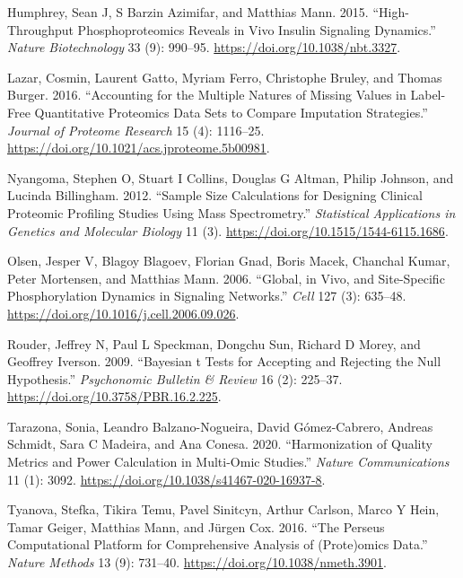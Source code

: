 \documentclass[
]{article}
\newlength{\cslhangindent}
\newenvironment{CSLReferences}[2] %
 {\begin{list}{}{%
  \setlength{\itemindent}{0pt}
  \setlength{\leftmargin}{0pt}
  \setlength{\parsep}{0pt}
  \ifodd #1
   \setlength{\leftmargin}{\cslhangindent}
   \setlength{\itemindent}{-1\cslhangindent}
  \fi
  \setlength{\itemsep}{#2\baselineskip}}}
 {\end{list}}
\begin{document}
\begin{CSLReferences}{1}{0}
Humphrey, Sean J, S Barzin Azimifar, and Matthias Mann. 2015.
{``High-Throughput Phosphoproteomics Reveals in Vivo Insulin Signaling
Dynamics.''} \emph{Nature Biotechnology} 33 (9): 990--95.
\url{https://doi.org/10.1038/nbt.3327}.

Lazar, Cosmin, Laurent Gatto, Myriam Ferro, Christophe Bruley, and
Thomas Burger. 2016. {``Accounting for the Multiple Natures of Missing
Values in Label-Free Quantitative Proteomics Data Sets to Compare
Imputation Strategies.''} \emph{Journal of Proteome Research} 15 (4):
1116--25. \url{https://doi.org/10.1021/acs.jproteome.5b00981}.

Nyangoma, Stephen O, Stuart I Collins, Douglas G Altman, Philip Johnson,
and Lucinda Billingham. 2012. {``Sample Size Calculations for Designing
Clinical Proteomic Profiling Studies Using Mass Spectrometry.''}
\emph{Statistical Applications in Genetics and Molecular Biology} 11
(3). \url{https://doi.org/10.1515/1544-6115.1686}.

Olsen, Jesper V, Blagoy Blagoev, Florian Gnad, Boris Macek, Chanchal
Kumar, Peter Mortensen, and Matthias Mann. 2006. {``Global, in Vivo, and
Site-Specific Phosphorylation Dynamics in Signaling Networks.''}
\emph{Cell} 127 (3): 635--48.
\url{https://doi.org/10.1016/j.cell.2006.09.026}.

Rouder, Jeffrey N, Paul L Speckman, Dongchu Sun, Richard D Morey, and
Geoffrey Iverson. 2009. {``Bayesian t Tests for Accepting and Rejecting
the Null Hypothesis.''} \emph{Psychonomic Bulletin \& Review} 16 (2):
225--37. \url{https://doi.org/10.3758/PBR.16.2.225}.

Tarazona, Sonia, Leandro Balzano-Nogueira, David Gómez-Cabrero, Andreas
Schmidt, Sara C Madeira, and Ana Conesa. 2020. {``Harmonization of
Quality Metrics and Power Calculation in Multi-Omic Studies.''}
\emph{Nature Communications} 11 (1): 3092.
\url{https://doi.org/10.1038/s41467-020-16937-8}.

Tyanova, Stefka, Tikira Temu, Pavel Sinitcyn, Arthur Carlson, Marco Y
Hein, Tamar Geiger, Matthias Mann, and Jürgen Cox. 2016. {``The
{Perseus} Computational Platform for Comprehensive Analysis of
(Prote)omics Data.''} \emph{Nature Methods} 13 (9): 731--40.
\url{https://doi.org/10.1038/nmeth.3901}.


\end{CSLReferences}
\end{document}
